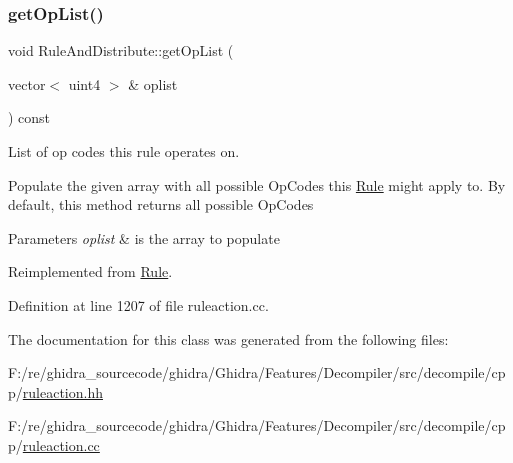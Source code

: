 \subsubsection{\texorpdfstring{getOpList()}{getOpList()}}
{\footnotesize\ttfamily void Rule\+And\+Distribute\+::get\+Op\+List (\begin{DoxyParamCaption}\item[{vector$<$ uint4 $>$ \&}]{oplist }\end{DoxyParamCaption}) const\hspace{0.3cm}{\ttfamily [virtual]}}



List of op codes this rule operates on. 

Populate the given array with all possible Op\+Codes this \mbox{\hyperlink{class_rule}{Rule}} might apply to. By default, this method returns all possible Op\+Codes 
\begin{DoxyParams}{Parameters}
{\em oplist} & is the array to populate \\
\hline
\end{DoxyParams}


Reimplemented from \mbox{\hyperlink{class_rule_a4023bfc7825de0ab866790551856d10e}{Rule}}.



Definition at line 1207 of file ruleaction.\+cc.



The documentation for this class was generated from the following files\+:\begin{DoxyCompactItemize}
\item 
F\+:/re/ghidra\+\_\+sourcecode/ghidra/\+Ghidra/\+Features/\+Decompiler/src/decompile/cpp/\mbox{\hyperlink{ruleaction_8hh}{ruleaction.\+hh}}\item 
F\+:/re/ghidra\+\_\+sourcecode/ghidra/\+Ghidra/\+Features/\+Decompiler/src/decompile/cpp/\mbox{\hyperlink{ruleaction_8cc}{ruleaction.\+cc}}\end{DoxyCompactItemize}
